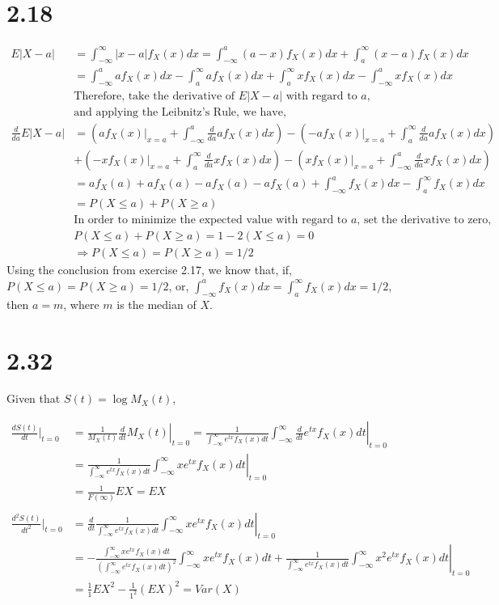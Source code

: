 \documentclass[letter]{article}
\newcommand{\fx}{f_X(x)}
\newcommand{\fxd}{f_X(x)dx}
\newcommand{\intia}{\int_{-\infty}^a}
\newcommand{\intii}{\int_{-\infty}^\infty}
\newcommand{\intai}{\int_a^\infty}
\newcommand{\mgf}{M_X(t)}
\begin{document}
    \section*{2.18}
    \begin{align*}
    E|X-a| & = \int_{-\infty}^\infty |x-a| \fxd
    = \intia (a-x) \fxd + \intai (x-a) \fxd \\
    & = \intia a \fxd - \intai a \fxd + \intai x \fxd - \intia x \fxd \\
    & \text{Therefore, take the derivative of $E|X-a|$ with regard to $a$}, \\
    & \text{and applying the Leibnitz's Rule, we have,}\\
    \frac{d}{da}E|X-a| & = \left(a\fx |_{x=a} + \intia \frac{d}{da} a \fxd
    \right) 
    - \left(-a\fx|_{x=a} + \intai \frac{d}{da} a \fxd \right) \\
    & + \left(-x\fx|_{x=a} + \intai \frac{d}{da} x \fxd \right) 
    - \left(x\fx|_{x=a} + \intia \frac{d}{da} x \fxd \right) \\
    & = af_X(a) + a f_X(a) - af_X(a) - af_X(a) 
    + \intia \fxd - \intai \fxd \\
    & = P(X \le a) + P(X \ge a) \\
    & \text{In order to minimize the expected value with regard to $a$, set the derivative to zero,} \\
    & P(X \le a) + P(X \ge a) = 1 - 2(X \le a) = 0 \\
    & \Rightarrow P(X \le a) = P(X \ge a) = 1/2 
    \end{align*}
    Using the conclusion from exercise 2.17, we know that, if,
    $P(X \le a) = P(X \ge a) = 1/2$, or, $\intia \fxd = \intai \fxd = 1/2$,
    then $a = m$, where $m$ is the median of $X$.

    \section*{2.32}
    Given that $S(t) = \log \mgf$,

    \begin{align*}
    \frac{dS(t)}{dt}|_{t=0} & = \left. \frac{1}{\mgf} \frac{d}{dt} \mgf \right|_{t=0} 
    = \left.\frac{1}{\intii e^{tx}\fx dt} \intii \frac{d}{dt} e^{tx}\fx dt\right|_{t=0} \\
    & = \left. \frac{1}{\intii e^{tx}\fx dt} \intii x e^{tx}\fx dt\right|_{t=0} \\
    & = \frac{1}{F(\infty)} EX = EX\\
    \\
    \frac{d^2S(t)}{dt^2}|_{t=0} & =
    \left. \frac{d}{dt} \frac{1}{\intii e^{tx}\fx dt} \intii x e^{tx}\fx dt\right|_{t=0} \\
    & = \left. -\frac{\intii x e^{tx} \fx dt}{\left(\intii e^{tx} \fx dt\right)^2} \intii x e^{tx} \fx dt + \frac{1}{\intii e^{tx}\fx dt} \intii x^2 e^{tx} \fx dt \right|_{t=0} \\
    & = \frac{1}{1}EX^2 - \frac{1}{1^2} (EX)^2 = Var(X)
    \end{align*}
\end{document}
